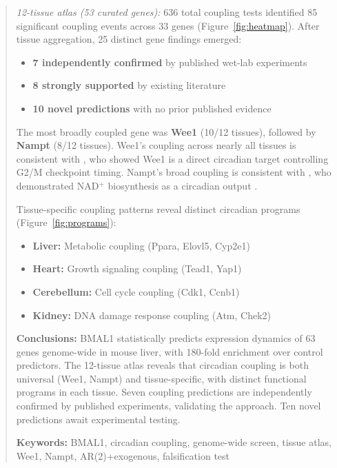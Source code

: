 \documentclass[11pt,letterpaper]{article}
\begin{document}
\begin{abstract}
\textit{12-tissue atlas (53 curated genes):} 636 total coupling tests identified 85 significant coupling events across 33 genes (Figure~\ref{fig:heatmap}). After tissue aggregation, 25 distinct gene findings emerged:
\begin{itemize}
\item \textbf{7 independently confirmed} by published wet-lab experiments
\item \textbf{8 strongly supported} by existing literature
\item \textbf{10 novel predictions} with no prior published evidence
\end{itemize}

The most broadly coupled gene was \textbf{Wee1} (10/12 tissues), followed by \textbf{Nampt} (8/12 tissues). Wee1's coupling across nearly all tissues is consistent with \citet{matsuo2003control}, who showed Wee1 is a direct circadian target controlling G2/M checkpoint timing. Nampt's broad coupling is consistent with \citet{ramsey2009circadian}, who demonstrated NAD$^+$ biosynthesis as a circadian output \citep{nakahata2009circadian, revollo2004nampt}.

Tissue-specific coupling patterns reveal distinct circadian programs (Figure~\ref{fig:programs}):
\begin{itemize}
\item \textbf{Liver:} Metabolic coupling (Ppara, Elovl5, Cyp2e1) \citep{yang2006nuclear}
\item \textbf{Heart:} Growth signaling coupling (Tead1, Yap1)
\item \textbf{Cerebellum:} Cell cycle coupling (Cdk1, Ccnb1)
\item \textbf{Kidney:} DNA damage response coupling (Atm, Chek2) \citep{fu2003circadian}
\end{itemize}

\noindent\textbf{Conclusions:} BMAL1 statistically predicts expression dynamics of 63 genes genome-wide in mouse liver, with 180-fold enrichment over control predictors. The 12-tissue atlas reveals that circadian coupling is both universal (Wee1, Nampt) and tissue-specific, with distinct functional programs in each tissue. Seven coupling predictions are independently confirmed by published experiments, validating the approach. Ten novel predictions await experimental testing.

\noindent\textbf{Keywords:} BMAL1, circadian coupling, genome-wide screen, tissue atlas, Wee1, Nampt, AR(2)+exogenous, falsification test
\end{abstract}
\end{document}
